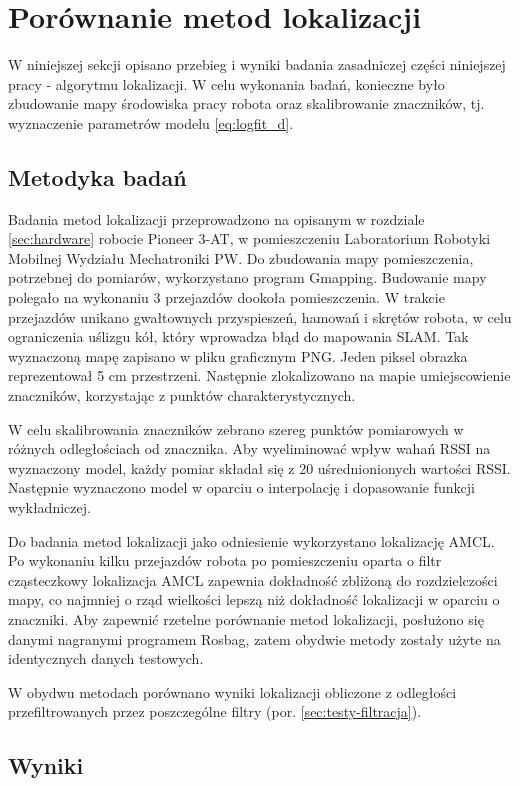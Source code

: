 \section{Porównanie metod lokalizacji}
W niniejszej sekcji opisano przebieg i wyniki badania zasadniczej części niniejszej pracy - algorytmu lokalizacji. W celu wykonania badań, konieczne było zbudowanie mapy środowiska pracy robota oraz skalibrowanie znaczników, tj. wyznaczenie parametrów modelu \ref{eq:logfit_d}. 
\subsection{Metodyka badań}
Badania metod lokalizacji przeprowadzono na opisanym w rozdziale \ref{sec:hardware} robocie Pioneer 3-AT, w pomieszczeniu Laboratorium Robotyki Mobilnej Wydziału Mechatroniki PW. Do zbudowania mapy pomieszczenia, potrzebnej do pomiarów, wykorzystano program Gmapping. Budowanie mapy polegało na wykonaniu 3 przejazdów dookoła pomieszczenia. W trakcie przejazdów unikano gwałtownych przyspieszeń, hamowań i skrętów robota, w celu ograniczenia uślizgu kół, który wprowadza błąd do mapowania SLAM. 
Tak wyznaczoną mapę zapisano w pliku graficznym PNG. Jeden piksel obrazka reprezentował 5 cm przestrzeni. Następnie zlokalizowano na mapie umiejscowienie znaczników, korzystając z punktów charakterystycznych. 

W celu skalibrowania znaczników zebrano szereg punktów pomiarowych w różnych odległościach od znacznika. Aby wyeliminować wpływ wahań RSSI na wyznaczony model, każdy pomiar składał się z 20 uśrednionionych wartości RSSI.  Następnie wyznaczono model w oparciu o interpolację i dopasowanie funkcji wykładniczej. 

Do badania metod lokalizacji jako odniesienie wykorzystano lokalizację AMCL. Po wykonaniu kilku przejazdów robota po pomieszczeniu oparta o filtr cząsteczkowy lokalizacja AMCL zapewnia dokładność zbliżoną do rozdzielczości mapy, co najmniej o rząd wielkości lepszą niż dokładność lokalizacji w oparciu o znaczniki. Aby zapewnić rzetelne porównanie metod lokalizacji, posłużono się danymi nagranymi programem Rosbag, zatem obydwie metody zostały użyte na identycznych danych testowych. 

W obydwu metodach porównano wyniki lokalizacji obliczone z odległości przefiltrowanych przez poszczególne filtry (por. \ref{sec:testy-filtracja}).
\subsection{Wyniki}

